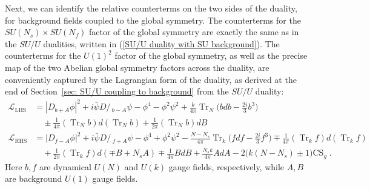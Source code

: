\documentclass[a4paper, 12pt]{article}
\numberwithin{equation}{section}
\newcommand{\Dslash}{D\!\!\!\!\slash\,}
\newcommand{\nn}{\nonumber}
\newcommand{\cL}{\mathcal{L}}
\DeclareMathOperator{\Tr}{Tr}
\begin{document}
Next, we can identify the relative counterterms on the two sides of the duality, for background fields coupled to the global symmetry. The counterterms for the $SU(N_s) \times SU(N_f)$ factor of the global symmetry are exactly the same as in the $SU/U$ dualities, written in (\ref{SU/U duality with SU background}). The counterterms for the $U(1)^2$ factor of the global symmetry, as well as the precise map of the two Abelian global symmetry factors across the duality, are conveniently captured by the Lagrangian form of the duality, as derived at the end of Section~\ref{sec: SU/U coupling to background} from the $SU/U$ duality:
\begin{align}
\label{U/U duality with U(1)2 background}
\cL_\text{LHS} &= |D_{b+A}\phi|^2 + i \bar\psi \Dslash_{b-A} \psi - \phi^4 - \phi^2\psi^2 + \frac{k}{4\pi} \Tr_N \Big( bdb- \frac{2i}3 b^3 \Big) \\
&\quad \pm \frac1{4\pi} (\Tr_N b) d (\Tr_N b) + \frac1{2\pi} (\Tr_N b)dB \nn\\
\cL_\text{RHS} &= |D_{f-A}\phi|^2 + i \bar\psi \Dslash_{f+A} \psi - \phi^4 + \phi^2\psi^2 - \frac{N-N_s}{4\pi} \Tr_k \Big( fdf - \frac{2i}3 f^3 \Big) \mp \frac1{4\pi} (\Tr_k f)d(\Tr_k f) \nn\\
&\quad + \frac1{2\pi} (\Tr_k f)d (\mp B + N_s A) \mp \frac1{4\pi} BdB + \frac{N_s k}{4\pi} AdA - 2 \big( k (N-N_s) \pm 1 \big) \text{CS}_g \;. \nn
\end{align}
Here $b,f$ are dynamical $U(N)$ and $U(k)$ gauge fields, respectively, while $A,B$ are background $U(1)$ gauge fields.
\end{document}
